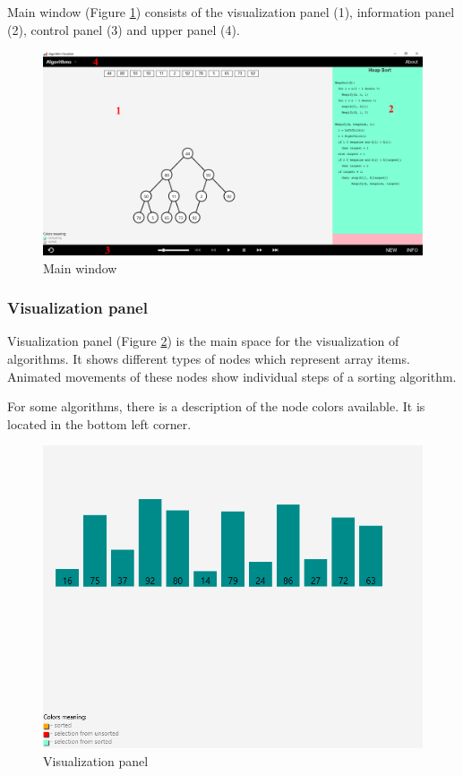 \documentclass[
  field=inf,
  biblatex,
  language=english,
  glossaries,
  theorems=false,
  sourcecodes=false,
  index
]{kidiplom}
\begin{document}
Main window (Figure \ref{fig:ui}) consists of the visualization panel (1), information panel (2), control panel (3) and upper panel (4).

\begin{figure}[H]
\begin{center}
	
	\includegraphics[width=\textwidth]{img/UI.png}
	\caption{Main window}\label{fig:ui}
\end{center}
\end{figure}

\subsubsection{Visualization panel}
Visualization panel (Figure \ref{fig:vispanel}) is the main space for the visualization of algorithms. It shows different types of nodes which represent array items. Animated movements of these nodes show individual steps of a sorting algorithm. 

For some algorithms, there is a description of the node colors available. It is located in the bottom left corner.

\begin{figure}[H]
\begin{center}
	
	\includegraphics[scale=0.4]{img/ui/Vispanel.png}
	\caption{Visualization panel}\label{fig:vispanel}
\end{center}
\end{figure}
\end{document}
